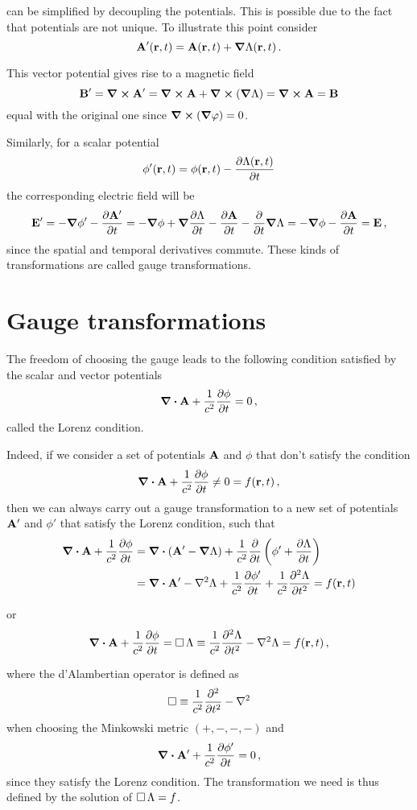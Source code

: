 \documentclass[12pt, class=report, crop=false]{standalone}
\begin{document}
can be simplified by decoupling the potentials. This is possible due to the fact
that potentials are not unique. To illustrate this point consider
\[
  \vb{A}'(\vb{r},t) = \vb{A}(\vb{r},t) + \grad{\Lambda}(\vb{r},t)\,.
\]

This vector potential gives rise to a magnetic field
\[
  \vb{B}' = \curl{\vb{A}'} = \curl{\vb{A}} + \curl(\grad{\Lambda})
          = \curl{\vb{A}} = \vb{B}
\]
equal with the original one since \( \curl(\grad{\varphi}) = 0 \).

Similarly, for a scalar potential
\[
  \phi'(\vb{r},t) = \phi(\vb{r},t) - \pdv{\Lambda(\vb{r},t)}{t}
\]
the corresponding electric field will be
\[
  \vb{E}' =
  - \grad{\phi'} - \pdv{\vb{A'}}{t} =
  - \grad{\phi} + \grad{\pdv{\Lambda}{t}} - \pdv{\vb{A}}{t} - \pdv{t} \grad{\Lambda}
  = - \grad{\phi} - \pdv{\vb{A}}{t}
  = \vb{E}\,,
\]
since the spatial and temporal derivatives commute. These kinds of transformations
are called gauge transformations.

\section{Gauge transformations}

The freedom of choosing the gauge leads to the following condition satisfied by
the scalar and vector potentials
\[
  \div{\vb{A}} + \frac{1}{c^2}\pdv{\phi}{t} = 0\,,
\]
called the Lorenz condition.

Indeed, if we consider a set of potentials \(\vb{A}\) and \(\phi\) that
don't satisfy the condition
\[
  \div{\vb{A}} + \frac{1}{c^2}\pdv{\phi}{t} \ne 0 = f(\vb{r},t)\,,
\]
then we can always carry out a gauge transformation to a new set of potentials
\(\vb{A}'\) and \(\phi'\) that satisfy the Lorenz condition, such that
\begin{align*}
  \div{\vb{A}} + \frac{1}{c^2}\pdv{\phi}{t} &= \div(\vb{A}' - \grad{\Lambda})
    + \frac{1}{c^2}\pdv{t} \left( \phi' + \pdv{\Lambda}{t} \right) \\
    &= \div{\vb{A}'} - \laplacian{\Lambda} + \frac{1}{c^2}\pdv{\phi'}{t}
    + \frac{1}{c^2}\pdv[2]{\Lambda}{t}
    = f(\vb{r},t)
\end{align*}

or
\[
  \div{\vb{A}} + \frac{1}{c^2}\pdv{\phi}{t} =
  \dalambert \Lambda \equiv \frac{1}{c^2}\pdv[2]{\Lambda}{t} - \laplacian{\Lambda} = f(\vb{r},t)\,,
\]

where the d'Alambertian operator is defined as
\[
  \dalambert \equiv \frac{1}{c^2}\pdv[2]{t} - \laplacian
\]
when choosing the Minkowski metric \( (+,-,-,-) \) and
\[
  \div{\vb{A'}} + \frac{1}{c^2}\pdv{\phi'}{t} = 0\,,
\]
since they satisfy the Lorenz condition.
The transformation we need is thus defined by the solution of \(\operatorname{\Box} \Lambda = f\).
\end{document}
